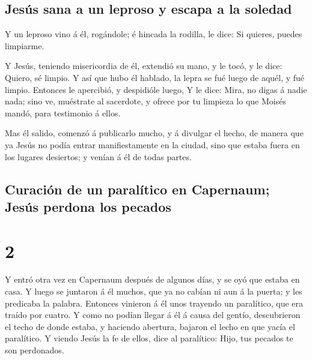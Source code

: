 \hypertarget{jesuxfas-sana-a-un-leproso-y-escapa-a-la-soledad}{%
\subsection{Jesús sana a un leproso y escapa a la
soledad}\label{jesuxfas-sana-a-un-leproso-y-escapa-a-la-soledad}}

 Y un leproso vino á él, rogándole; é hincada la rodilla,
le dice: Si quieres, puedes limpiarme.

 Y Jesús, teniendo misericordia de él, extendió su mano,
y le tocó, y le dice: Quiero, sé limpio.  Y así que hubo
él hablado, la lepra se fué luego de aquél, y fué limpio.
 Entonces le apercibió, y despidióle luego,
 Y le dice: Mira, no digas á nadie nada; sino ve,
muéstrate al sacerdote, y ofrece por tu limpieza lo que Moisés mandó,
para testimonio á ellos.

 Mas él salido, comenzó á publicarlo mucho, y á divulgar
el hecho, de manera que ya Jesús no podía entrar manifiestamente en la
ciudad, sino que estaba fuera en los lugares desiertos; y venían á él de
todas partes.

\hypertarget{curaciuxf3n-de-un-paraluxedtico-en-capernaum-jesuxfas-perdona-los-pecados}{%
\subsection{Curación de un paralítico en Capernaum; Jesús perdona los
pecados}\label{curaciuxf3n-de-un-paraluxedtico-en-capernaum-jesuxfas-perdona-los-pecados}}

\hypertarget{section-41-2}{%
\section{2}\label{section-41-2}}

 Y entró otra vez en Capernaum después de algunos días, y
se oyó que estaba en casa.  Y luego se juntaron á él
muchos, que ya no cabían ni aun á la puerta; y les predicaba la palabra.
 Entonces vinieron á él unos trayendo un paralítico, que
era traído por cuatro.  Y como no podían llegar á él á
causa del gentío, descubrieron el techo de donde estaba, y haciendo
abertura, bajaron el lecho en que yacía el paralítico.  Y
viendo Jesús la fe de ellos, dice al paralítico: Hijo, tus pecados te
son perdonados.

